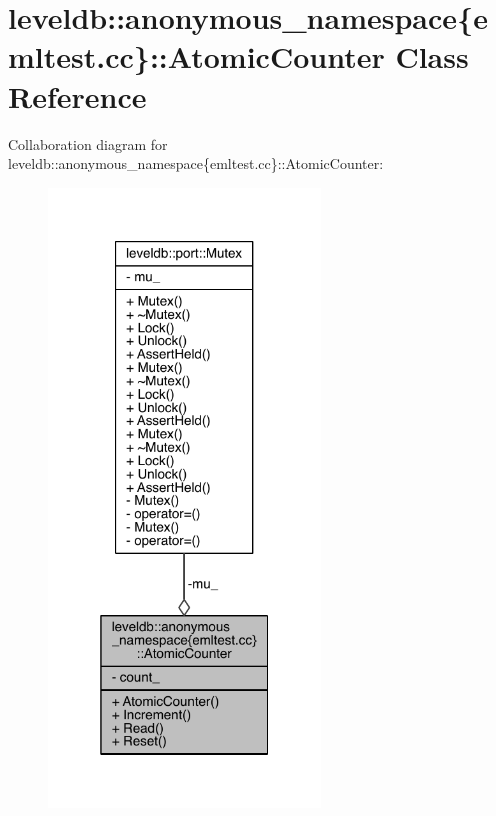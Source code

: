\hypertarget{classleveldb_1_1anonymous__namespace_02emltest_8cc_03_1_1_atomic_counter}{}\section{leveldb\+:\+:anonymous\+\_\+namespace\{emltest.\+cc\}\+:\+:Atomic\+Counter Class Reference}
\label{classleveldb_1_1anonymous__namespace_02emltest_8cc_03_1_1_atomic_counter}


Collaboration diagram for leveldb\+:\+:anonymous\+\_\+namespace\{emltest.\+cc\}\+:\+:Atomic\+Counter\+:
\nopagebreak
\begin{figure}[H]
\begin{center}
\leavevmode
\includegraphics[width=205pt]{classleveldb_1_1anonymous__namespace_02emltest_8cc_03_1_1_atomic_counter__coll__graph}
\end{center}
\end{figure}
